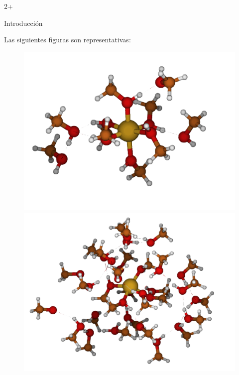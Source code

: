 \documentclass[final]{beamer}
\newlength{\sepwidth}
\newlength{\colwidth}
\begin{document}
\begin{frame}[t]
	\begin{columns}[t]
	
		\begin{column}{2\colwidth+\sepwidth}
			\begin{alertblock}{Introducción}

				Las siguientes figuras son representativas:

				\begin{figure}[H]
					\centering
					\begin{minipage}[b]{0.25\textwidth}
						\centering
						\includegraphics[width=\textwidth]{logos/Cu-10CH4O.png}
					\end{minipage}%
					\hfill
					\begin{minipage}[b]{0.25\textwidth}
						\centering
						\includegraphics[width=\textwidth]{logos/Cu-30CH4O.png}

\end{minipage}
\end{figure}
\end{alertblock}
\end{column}
\end{columns}
\end{frame}
\end{document}
